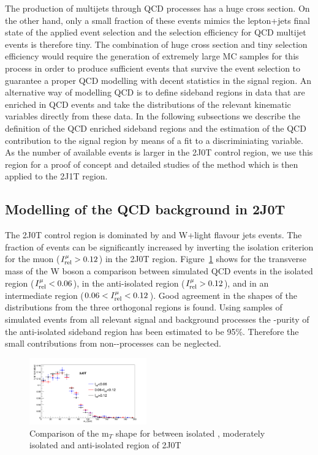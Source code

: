  The production of multijets through QCD processes has a huge cross section. On the other hand, only a small fraction of these events mimics the lepton+jets final state of the applied event selection and the selection efficiency for QCD multijet events is therefore tiny. The combination of huge cross section and tiny selection efficiency would require the generation of extremely large MC samples for this process in order to produce sufficient events that survive the event selection to guarantee a proper QCD modelling with decent statistics in the signal region.
 An alternative way of modelling QCD is to define sideband regions in data that are enriched in QCD events and take the distributions of the relevant kinematic variables directly from these data. In the following subsections we describe the definition of the QCD enriched sideband regions and the estimation of the QCD contribution to the signal region by means of a fit to a discriminiating variable. As the number of available events is larger in the 2J0T control region, we use this region for a proof of concept and detailed studies of the method which is then applied to the 2J1T region.

 
\subsection{Modelling of the QCD background in 2J0T}

The 2J0T control region is dominated by \QCD and W+light flavour jets events. The fraction of \QCD events can be significantly increased by inverting the isolation criterion for the muon ($I_{\rm rel}^{\mu} > 0.12$) in the 2J0T region. Figure~\ref{fig:qcdshape} shows for the transverse mass of the W boson a comparison between simulated QCD events in the isolated region ($I_{\rm rel}^{\mu} < 0.06$), in the anti-isolated region ($I_{\rm rel}^{\mu} > 0.12$), and in an intermediate region ($0.06 < I_{\rm rel}^{\mu} < 0.12$). Good agreement in the shapes of the distributions from the three orthogonal regions is found. Using samples of simulated events from all relevant signal and background processes the \QCD-purity of the anti-isolated  sideband region has been estimated to be 95\%. Therefore the small contributions from non-\QCD-processes can be neglected. 

\begin{figure}[hbpt]
\begin{center}
\includegraphics[width=0.45\textwidth]{figures/2J0T/Sep3/QCD_mtW_shape_Comparison.png}
\caption{\label{fig:qcdshape}Comparison of the m$_{T}$ shape for \QCD between isolated , moderately isolated  and anti-isolated region of 2J0T}
\end{center}
\end{figure}


